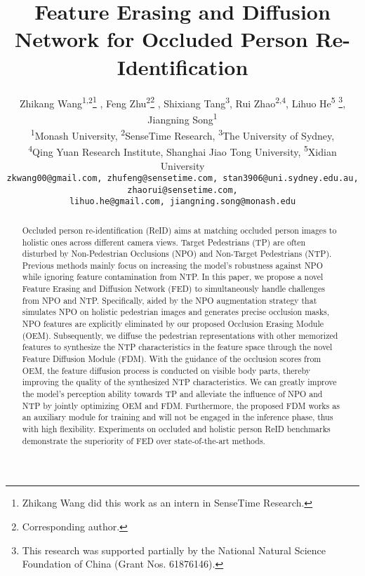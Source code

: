 \documentclass[10pt,twocolumn,letterpaper]{article}
\title{Feature Erasing and Diffusion Network for Occluded Person Re-Identification}
\begin{document}
\author{Zhikang Wang\textsuperscript{1,2}\thanks{Zhikang Wang did this work as an intern in SenseTime Research.} , 
Feng Zhu\textsuperscript{2}\thanks{Corresponding author.} , Shixiang Tang\textsuperscript{3}, Rui Zhao\textsuperscript{2,4}, Lihuo He\textsuperscript{5} \thanks{This research was supported partially by the National Natural Science Foundation of China (Grant Nos. 61876146). }, Jiangning Song\textsuperscript{1} \\
\textsuperscript{1}Monash University, \textsuperscript{2}SenseTime Research, \textsuperscript{3}The University of Sydney, \\ 
\textsuperscript{4}Qing Yuan Research Institute, Shanghai Jiao Tong University, \textsuperscript{5}Xidian University \\
{\tt\small zkwang00@gmail.com, zhufeng@sensetime.com, stan3906@uni.sydney.edu.au, zhaorui@sensetime.com,}\\ {\tt\small lihuo.he@gmail.com, jiangning.song@monash.edu}
}

\maketitle




\begin{abstract}
Occluded person re-identification (ReID) aims at matching occluded person images to holistic ones across different camera views. Target Pedestrians (TP) are often disturbed by Non-Pedestrian Occlusions (NPO) and Non-Target Pedestrians (NTP). Previous methods mainly focus on increasing the model's robustness against NPO while ignoring feature contamination from NTP. In this paper, we propose a novel Feature Erasing and Diffusion Network (FED) to simultaneously handle challenges from NPO and NTP. Specifically, aided by the NPO augmentation strategy that simulates NPO on holistic pedestrian images and generates precise occlusion masks, NPO features are explicitly eliminated by our proposed Occlusion Erasing Module (OEM). Subsequently, we diffuse the pedestrian representations with other memorized features to synthesize the NTP characteristics in the feature space through the novel Feature Diffusion Module (FDM). With the guidance of the occlusion scores from OEM, the feature diffusion process is conducted on visible body parts, thereby improving the quality of the synthesized NTP characteristics. We can greatly improve the model's perception ability towards TP and alleviate the influence of NPO and NTP by jointly optimizing OEM and FDM. Furthermore, the proposed FDM works as an auxiliary module for training and will not be engaged in the inference phase, thus with high flexibility. Experiments on occluded and holistic person ReID benchmarks demonstrate the superiority of FED over state-of-the-art methods. 
\end{abstract}
\end{document}
